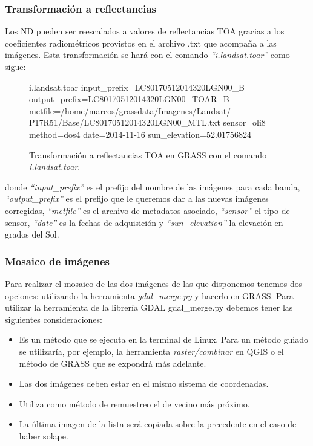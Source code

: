 \subsubsection{Transformación a reflectancias}
Los \ac{ND} pueden ser reescalados a valores de reflectancias \ac{TOA} gracias a los coeficientes radiométricos provistos en el archivo .txt que acompaña a las imágenes. Esta transformación se hará con el comando \textit{``i.landsat.toar''} como sigue:

\begin{figure}[h]
\centering
\begin{boxedverbatim}
	i.landsat.toar
	input_prefix=LC80170512014320LGN00_B
	output_prefix=LC80170512014320LGN00_TOAR_B
	metfile=/home/marcos/grassdata/Imagenes/Landsat/
	P17R51/Base/LC80170512014320LGN00_MTL.txt
	sensor=oli8
	method=dos4
	date=2014-11-16
	sun_elevation=52.01756824
\end{boxedverbatim}
\caption[Transformación a reflectancias]{Transformación a reflectancias TOA en GRASS con el comando \textit{i.landsat.toar}.}
\end{figure}

donde \textit{``input\_prefix''} es el prefijo del nombre de las imágenes para cada banda, \textit{``output\_prefix''} es el prefijo que le queremos dar a las nuevas imágenes corregidas, \textit{``metfile''} es el archivo de metadatos asociado, \textit{``sensor''} el tipo de sensor, \textit{``date''} es la fechas de adquisición y \textit{``sun\_elevation''} la elevación en grados del Sol.

\subsubsection{Mosaico de imágenes}
Para realizar el mosaico de las dos imágenes de las que disponemos tenemos dos opciones: utilizando la herramienta \textit{gdal\_merge.py} y hacerlo en GRASS. Para utilizar la herramienta de la librería \ac{GDAL} gdal\_merge.py debemos tener las siguientes consideraciones:

\begin{itemize}
	\item Es un método que se ejecuta en la terminal de Linux. Para un método guiado se utilizaría, por ejemplo, la herramienta \textit{raster/combinar} en QGIS o el método de GRASS que se expondrá más adelante.
	\item Las dos imágenes deben estar en el mismo sistema de coordenadas.
	\item Utiliza como método de remuestreo el de vecino más próximo.
	\item La última imagen de la lista será copiada sobre la precedente en el caso de haber solape.
\end{itemize}

